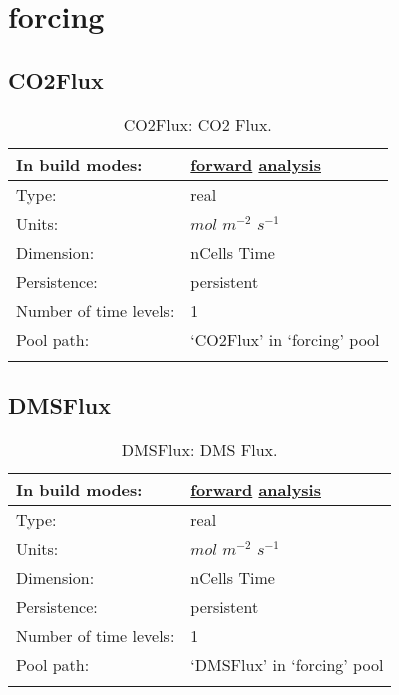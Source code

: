 \section[forcing]{forcing}
\label{sec:var_sec_forcing}
\subsection[CO2Flux]{CO2Flux}
\label{subsec:var_sec_forcing_CO2Flux}
\begin{center}
\begin{longtable}{| p{2.0in} | p{4.0in} |}
        \hline 
        In build modes: & \hyperref[subsec:forward_var_tab_forcing]{forward} \hyperref[subsec:analysis_var_tab_forcing]{analysis} \\
        \hline 
        Type: & real \\
        \hline 
        Units: & $mol$ $m^{-2}$ $s^{-1}$ \\
        \hline 
        Dimension: & nCells Time \\
        \hline 
        Persistence: & persistent \\
        \hline 
        Number of time levels: & 1 \\
        \hline 
            Pool path: & `CO2Flux' in `forcing' pool \\
		 \hline 
    \caption{CO2Flux: CO2 Flux.}
\end{longtable}
\end{center}
\subsection[DMSFlux]{DMSFlux}
\label{subsec:var_sec_forcing_DMSFlux}
\begin{center}
\begin{longtable}{| p{2.0in} | p{4.0in} |}
        \hline 
        In build modes: & \hyperref[subsec:forward_var_tab_forcing]{forward} \hyperref[subsec:analysis_var_tab_forcing]{analysis} \\
        \hline 
        Type: & real \\
        \hline 
        Units: & $mol$ $m^{-2}$ $s^{-1}$ \\
        \hline 
        Dimension: & nCells Time \\
        \hline 
        Persistence: & persistent \\
        \hline 
        Number of time levels: & 1 \\
        \hline 
            Pool path: & `DMSFlux' in `forcing' pool \\
		 \hline 
    \caption{DMSFlux: DMS Flux.}
\end{longtable}
\end{center}
